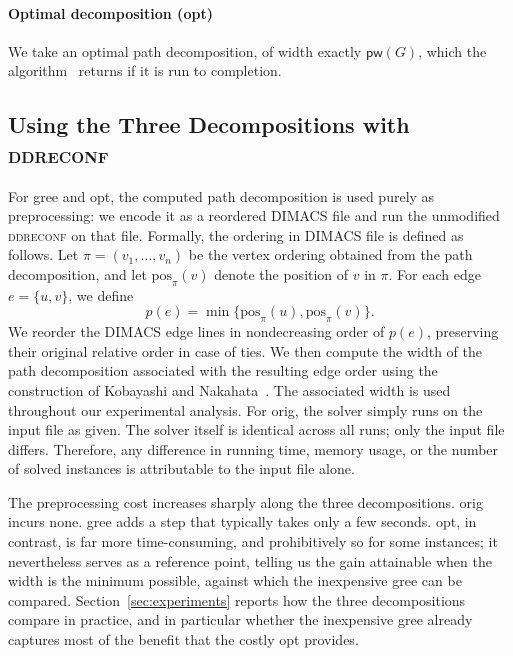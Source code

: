 \documentclass[conference]{IEEEtran}
\newcommand{\OrigDecom}{\textsf{orig}\xspace}
\newcommand{\HeurDecom}{\textsf{gree}\xspace}
\newcommand{\OptDecom}{\textsf{opt}\xspace}
\begin{document}
\paragraph{Optimal decomposition (\OptDecom)}
We take an optimal path decomposition, of width exactly $\mathsf{pw}(G)$, which
the algorithm~\cite{KobayashiKomuroTamaki2014} returns if it is run to
completion. 


\subsection{Using the Three Decompositions with \textsc{ddreconf}}
\label{subsec:integration}

For \HeurDecom and \OptDecom, the computed path decomposition is used purely as
preprocessing: we encode it as a reordered DIMACS file and run the unmodified
\textsc{ddreconf} on that file. 
Formally, the ordering in DIMACS file is defined as follows.
Let \(\pi=(v_1,\ldots,v_n)\) be the vertex ordering obtained from the path decomposition, and let \(\mathrm{pos}_\pi(v)\) denote the position of \(v\) in \(\pi\). For each edge 
\(e=\{u,v\}\), we define
\[
p(e)=\min\{\mathrm{pos}_\pi(u),\mathrm{pos}_\pi(v)\}.
\]
We reorder the DIMACS edge lines in nondecreasing order of \(p(e)\), preserving their original relative order in case of ties. We then compute the width of the path decomposition  associated with the resulting edge order using the construction of Kobayashi and Nakahata~\cite{KobayashiNakahata2020}. The associated width is used throughout our experimental analysis. 
For \OrigDecom, the solver simply runs on the
input file as given. The solver itself is identical across all runs; only the input file differs. 
Therefore, any difference in running time, memory usage, or the number of solved instances is attributable to the input file alone.

The preprocessing cost increases sharply along the three decompositions.
\OrigDecom incurs none. \HeurDecom adds a step that typically takes only a few
seconds. \OptDecom, in contrast, is far more time-consuming, and prohibitively
so for some instances; it nevertheless serves as a reference point, telling us
the gain attainable when the width is the minimum possible, against which the
inexpensive \HeurDecom can be compared.
Section~\ref{sec:experiments} reports how the three decompositions compare in
practice, and in particular whether the inexpensive \HeurDecom already captures
most of the benefit that the costly \OptDecom provides.
\end{document}
